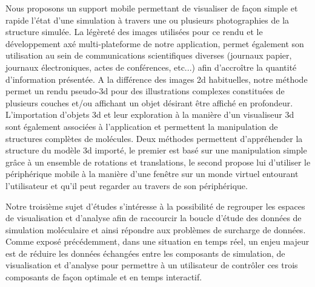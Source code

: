 Nous proposons un support mobile permettant de visualiser de façon simple et rapide l'état d'une simulation à travers une ou plusieurs photographies de la structure simulée. La légèreté des images utilisées pour ce rendu et le développement axé multi-plateforme de notre application, permet également son utilisation au sein de communications scientifiques diverses (journaux papier, journaux électroniques, actes de conférences, etc...) afin d’accroître la quantité d'information présentée. A la différence des images 2d habituelles, notre méthode permet un rendu pseudo-3d pour des illustrations complexes constituées de plusieurs couches et/ou affichant un objet désirant être affiché en profondeur. 
L'importation d'objets 3d et leur exploration à la manière d'un visualiseur 3d sont également associées à l'application et permettent la manipulation de structures complètes de molécules. Deux méthodes permettent d'appréhender la structure du modèle 3d importé, le premier est basé sur une manipulation simple grâce à un ensemble de rotations et translations, le second propose lui d'utiliser le périphérique mobile à la manière d'une fenêtre sur un monde virtuel entourant l'utilisateur et qu'il peut regarder au travers de son périphérique.


Notre troisième sujet d'études s'intéresse à la possibilité de regrouper les espaces de visualisation et d'analyse afin de raccourcir la boucle d'étude des données de simulation moléculaire et ainsi répondre aux problèmes de surcharge de données. Comme exposé précédemment, dans une situation en temps réel, un enjeu majeur est de réduire les données échangées entre les composants de simulation, de visualisation et d'analyse pour permettre à un utilisateur de contrôler ces trois composants de façon optimale et en temps interactif.

